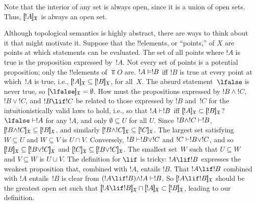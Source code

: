 \documentclass[../../../include/open-logic-section]{subfiles}
\begin{document}
Note that the interior of any set is always open, since it is a union
of open sets. Thus, $\Prop{X}{!A}$ is always an open set.

Although topological semantics is highly abstract, there are ways to
think about it that might motivate it. Suppose that the !!{element}s,
or ``points,'' of $X$ are points at which statements can be
evaluated. The set of all points where $!A$ is true is the proposition
expressed by~$!A$. Not every set of points is a potential proposition;
only the !!{element}s of $\Top{O}$ are.  $!A \Entails !B$ iff $!B$ is
true at every point at which~$!A$ is true, i.e., $\Prop{X}{!A}
\subseteq \Prop{X}{!B}$, for all~$X$. The absurd statement~$\lfalse$
is never true, so $\Prop{X}{\lfalse} = \emptyset$. How must the
propositions expressed by $!B \land !C$, $!B \lor !C$, and $!B \lif
!C$ be related to those expressed by $!B$ and~$!C$ for the
intuitionistically valid laws to hold, i.e., so that $!A \Proves !B$
iff $\Prop{X}{!A} \subset \Prop{X}{!B}$? $\lfalse \Proves !A$ for any
$!A$, and only $\emptyset \subseteq U$ for all $U$.  Since $!B \land
!C \Proves !B$, $\Prop{X}{!B \land !C} \subseteq \Prop{X}{!B}$, and
similarly $\Prop{X}{!B \land !C} \subseteq \Prop{X}{!C}$. The largest
set satisfying $W \subseteq U$ and $W \subseteq V$ is $U \cap V$.
Conversely, $!B \Proves !B \lor !C$ and $!C \Proves !B \lor !C$, and
so $\Prop{X}{!B} \subseteq \Prop{X}{!B \lor !C}$ and $\Prop{X}{!C}
\subseteq \Prop{X}{!B \lor !C}$. The smallest set~$W$ such that $U
\subseteq W$ and $V \subseteq W$ is $U \cup V$.  The definition for
$\lif$ is tricky: $!A \lif !B$ expresses the weakest proposition that,
combined with $!A$, entails $!B$. That $!A \lif !B$ combined with $!A$
entails~$!B$ is clear from $(!A \lif !B) \land !A \Proves !B $. So
$\Prop{X}{!A \lif !B}$ should be the greatest open set such that
$\Prop{X}{!A \lif !B} \cap \Prop{X}{!A} \subset \Prop{X}{!B}$, leading
to our definition.
\end{document}
